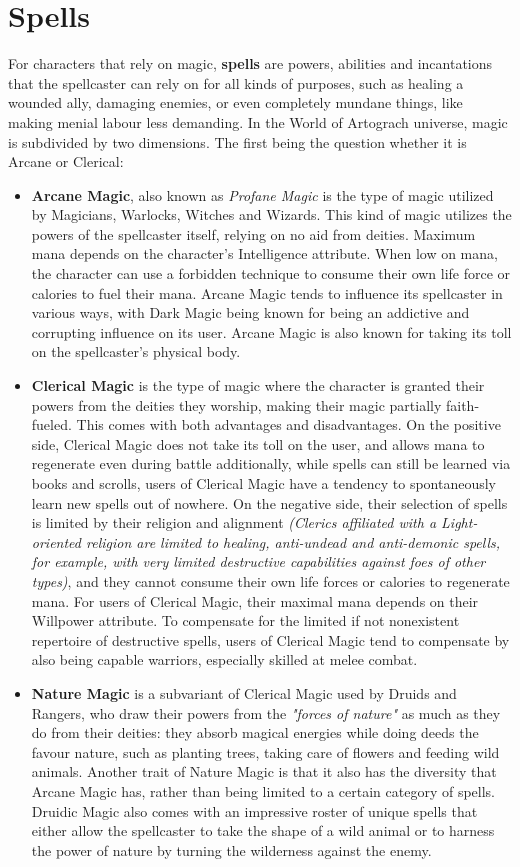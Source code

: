 \section{Spells}
For characters that rely on magic, \textbf{spells} are powers, abilities and incantations that the spellcaster can rely on for all kinds of purposes, such as healing a wounded ally, damaging enemies, or even completely mundane things, like making menial labour less demanding. In the World of Artograch universe, magic is subdivided by two dimensions. The first being the question whether it is Arcane or Clerical:
\begin{itemize}
\item \textbf{Arcane Magic}, also known as \textit{Profane Magic} is the type of magic utilized by Magicians, Warlocks, Witches and Wizards. This kind of magic utilizes the powers of the spellcaster itself, relying on no aid from deities. Maximum mana depends on the character's Intelligence attribute. When low on mana, the character can use a forbidden technique to consume their own life force or calories to fuel their mana. Arcane Magic tends to influence its spellcaster in various ways, with Dark Magic being known for being an addictive and corrupting influence on its user. Arcane Magic is also known for taking its toll on the spellcaster's physical body.
\item \textbf{Clerical Magic} is the type of magic where the character is granted their powers from the deities they worship, making their magic partially faith-fueled. This comes with both advantages and disadvantages. On the positive side, Clerical Magic does not take its toll on the user, and allows mana to regenerate even during battle \textemdash additionally, while spells can still be learned via books and scrolls, users of Clerical Magic have a tendency to spontaneously learn new spells out of nowhere. On the negative side, their selection of spells is limited by their religion and alignment \textit{(Clerics affiliated with a Light-oriented religion are limited to healing, anti-undead and anti-demonic spells, for example, with very limited destructive capabilities against foes of other types)}, and they cannot consume their own life forces or calories to regenerate mana. For users of Clerical Magic, their maximal mana depends on their Willpower attribute. To compensate for the limited \textemdash if not nonexistent \textemdash repertoire of destructive spells, users of Clerical Magic tend to compensate by also being capable warriors, especially skilled at melee combat. 
\item \textbf{Nature Magic} is a subvariant of Clerical Magic used by Druids and Rangers, who draw their powers from the \textit{"forces of nature"} as much as they do from their deities: they absorb magical energies while doing deeds the favour nature, such as planting trees, taking care of flowers and feeding wild animals. Another trait of Nature Magic is that it also has the diversity that Arcane Magic has, rather than being limited to a certain category of spells. Druidic Magic also comes with an impressive roster of unique spells that either allow the spellcaster to take the shape of a wild animal or to harness the power of nature by turning the wilderness against the enemy.
\end{itemize}
